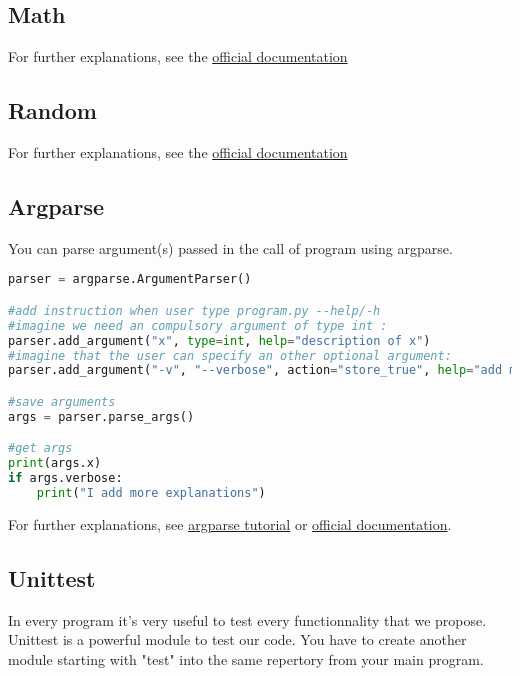 \documentclass[a4paper, 12pt, titlepage]{scrartcl} %
\begin{document}
\subsection{Math}
For further explanations, see the \href{https://docs.python.org/3/library/math.html}{official documentation}

\subsection{Random}
For further explanations, see the \href{https://docs.python.org/3/library/random.html}{official documentation}

\subsection{Argparse}
You can parse argument(s) passed in the call of program using argparse.
\begin{lstlisting}[language=Python]
parser = argparse.ArgumentParser()

#add instruction when user type program.py --help/-h
#imagine we need an compulsory argument of type int :
parser.add_argument("x", type=int, help="description of x")
#imagine that the user can specify an other optional argument:
parser.add_argument("-v", "--verbose", action="store_true", help="add more explanation")

#save arguments
args = parser.parse_args()

#get args
print(args.x)
if args.verbose:
    print("I add more explanations")
\end{lstlisting} \vspace{5mm}
For further explanations, see \href{http://www.sharelatex.com}{argparse tutorial} or  \href{https://docs.python.org/3/library/argparse.html}{official documentation}.


\subsection{Unittest}
In every program it's very useful to test every functionnality that we propose. Unittest is a powerful module to test our code. You have to create another module starting with "test" into the same repertory from your main program.

\vspace{5mm}
\end{document}
